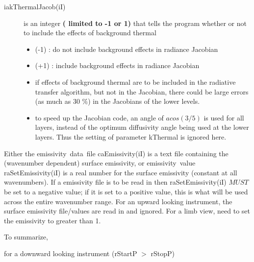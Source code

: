 \documentclass[12pt]{article}
\begin{document}
{\begin{description}
\item[{\sf iakThermalJacob(iI)}] is an integer {\bf( limited to -1 or 1)} that 
tells the program whether or not to include the effects of background thermal
\begin{itemize}
\item (-1) : do not include background effects in radiance Jacobian
\item (+1) : include background effects in radiance Jacobian
\item if effects of background thermal are to be included in the
  radiative transfer algorithm, but not in the Jacobian, there could
  be large errors (as much as 30 \%) in the Jacobians of the lower
  levels.
\item to speed up the Jacobian code, an angle of $acos(3/5)$ is used
  for all layers, instead of the optimum diffusivity angle being used
  at the lower layers.  Thus the setting of parameter {\sf kThermal}
  is ignored here.
\end{itemize} 
\end{description}

Either the {\sf emissivity~data~file caEmissivity(iI)} is a text file 
containing the (wavenumber dependent) surface emissivity, or {\sf 
emissivity~value raSetEmissivity(iI)} is a real number for the surface 
emissivity (constant at all wavenumbers). If a emissivity file is to be read
in then raSetEmissivity(iI) $MUST$ be set to a negative value; if it is set
to a positive value, this is what will be used across the entire wavenumber
range. For an upward looking instrument, the surface
emissivity file/values are read in and ignored.  For a limb view, need to set
the emissivity to greater than 1.

To summarize,

\medskip
\noindent for a downward looking instrument (rStartP $>$ rStopP)

}
\end{document}
